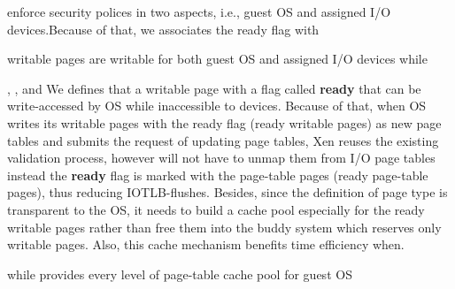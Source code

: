 enforce security polices in two aspects, i.e., guest OS and assigned I/O devices.Because of that, we associates the ready flag with

writable pages are writable for both guest OS and assigned I/O devices while

, , and  We defines that a writable page with a flag called \textbf{ready} that can be write-accessed by OS while inaccessible to devices. Because of that, when OS writes its writable pages with the ready flag (ready writable pages) as new page tables and submits the request of updating page tables, Xen reuses the existing validation process, however will not have to unmap them from I/O page tables instead the \textbf{ready} flag is marked with the page-table pages (ready page-table pages), thus reducing IOTLB-flushes. Besides, since the definition of page type is transparent to the OS, it needs to build a cache pool especially for the ready writable pages rather than free them into the buddy system which reserves only writable pages. Also, this cache mechanism benefits time efficiency when.

while provides every level of page-table cache pool for guest OS
